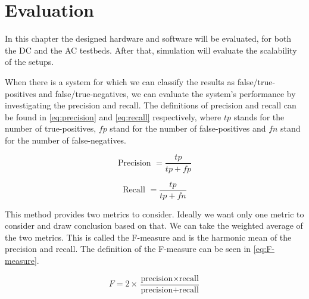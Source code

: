 
\chapter{Evaluation}
\label{chp:evaluation}


In this chapter the designed hardware and software will be evaluated, for both the DC and the AC testbeds.
After that, simulation will evaluate the scalability of the setups.

When there is a system for which we can classify the results as false/true-positives and false/true-negatives, we can evaluate the system's performance by investigating the precision and recall.
The definitions of precision and recall can be found in \autoref{eq:precision} and \autoref{eq:recall} respectively, where $tp$ stands for the number of true-positives, $fp$ stand for the number of false-positives and $fn$ stand for the number of false-negatives.

\begin{equation}
	\label{eq:precision}
	\text{Precision } = \frac{tp}{tp + fp}
\end{equation}

\begin{equation}
	\label{eq:recall}
	\text{Recall } = \frac{tp}{tp + fn}
\end{equation}

This method provides two metrics to consider.
Ideally we want only one metric to consider and draw conclusion based on that.
We can take the weighted average of the two metrics.
This is called the F-measure \cite{sokolova2009systematic} and is the harmonic mean of the precision and recall.
The definition of the F-measure can be seen in \autoref{eq:F-measure}.

\begin{equation}
	\label{eq:F-measure}
	F = 2 \times \frac{\text{precision} \times \text{recall}}{\text{precision} + \text{recall}}
\end{equation}













